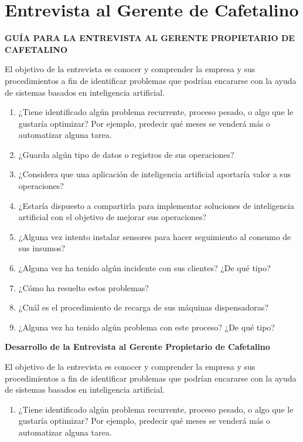 \section{Entrevista al Gerente de Cafetalino}\label{anexo-entrevista-al-gerente-de-cafetalino}

\textbf{GUÍA PARA LA ENTREVISTA AL GERENTE PROPIETARIO DE CAFETALINO}

El objetivo de la entrevista es conocer y comprender la empresa y sus procedimientos a fin de identificar problemas que podrían encararse con la ayuda de sistemas basados en inteligencia artificial.

\begin{enumerate}
\def\labelenumi{\arabic{enumi}.}
\item
  ¿Tiene identificado algún problema recurrente, proceso pesado, o algo que le gustaría optimizar? Por ejemplo, predecir qué meses se venderá más o automatizar alguna tarea.
\item
  ¿Guarda algún tipo de datos o registros de sus operaciones?
\item
  ¿Considera que una aplicación de inteligencia artificial aportaría valor a sus operaciones?
\item
  ¿Estaría dispuesto a compartirla para implementar soluciones de inteligencia artificial con el objetivo de mejorar sus operaciones?
\item
  ¿Alguna vez intento instalar sensores para hacer seguimiento al consumo de sus insumos?
\item
  ¿Alguna vez ha tenido algún incidente con sus clientes? ¿De qué tipo?
\item
  ¿Cómo ha resuelto estos problemas?
\item
  ¿Cuál es el procedimiento de recarga de sus máquinas dispensadoras?
\item
  ¿Alguna vez ha tenido algún problema con este proceso? ¿De qué tipo?
\end{enumerate}

\textbf{Desarrollo de la Entrevista al Gerente Propietario de Cafetalino}

El objetivo de la entrevista es conocer y comprender la empresa y sus procedimientos a fin de identificar problemas que podrían encararse con la ayuda de sistemas basados en inteligencia artificial.

\begin{enumerate}
\def\labelenumi{\arabic{enumi}.}
\item
  ¿Tiene identificado algún problema recurrente, proceso pesado, o algo que le gustaría optimizar? Por ejemplo, predecir qué meses se venderá más o automatizar alguna tarea.
\end{enumerate}

